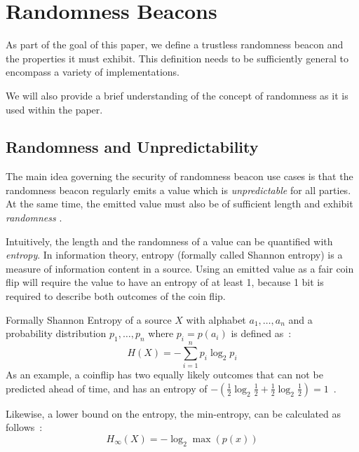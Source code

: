 \section{Randomness Beacons}\label{sec:beacons}

As part of the goal of this paper, we define a trustless randomness beacon and the properties it must exhibit.
This definition needs to be sufficiently general to encompass a variety of implementations.

We will also provide a brief understanding of the concept of randomness as it is used within the paper.

\subsection{Randomness and Unpredictability}\label{sub:beacons_randomness}
The main idea governing the security of randomness beacon use cases is that the randomness beacon regularly emits a value which is \emph{unpredictable} for all parties.
At the same time, the emitted value must also be of sufficient length and exhibit \emph{randomness} .

Intuitively, the length and the randomness of a value  can be quantified with \emph{entropy}.
In information theory, entropy (formally called Shannon entropy) is a measure of information content in a source.
Using an emitted value as a fair coin flip will require the value to have an entropy of at least 1, because 1 bit is required to describe both outcomes of the coin flip.

Formally Shannon Entropy of a source $X$ with alphabet ${a_1, \ldots, a_n}$ and a probability distribution ${p_1, \ldots , p_n}$ where $p_i = p(a_i)$ is defined as~\cite{informationtheory}:
$$
H(X) = -\sum\limits_{i = 1}^n p_{i}\log_{2} p_{i}
$$
As an example, a coinflip has two equally likely outcomes that can not be predicted ahead of time, and has an entropy of $-(\frac{1}{2}\log_2 \frac{1}{2} + \frac{1}{2}\log_2 \frac{1}{2}) = 1$~\cite{informationtheory}.

Likewise, a lower bound on the entropy, the min-entropy, can be calculated as follows~\cite{informationtheory}: 
$$
H_\infty(X) = -\log_{2}\max(p(x))
$$

